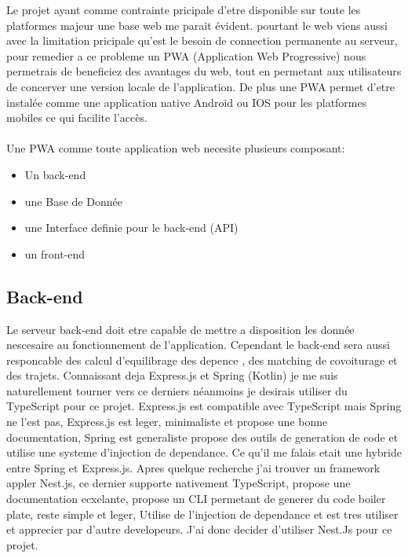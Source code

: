 
Le projet ayant comme contrainte pricipale d'etre disponible sur toute les platformes majeur une base web me parait évident.
pourtant le web viens aussi avec la limitation pricipale qu'est le besoin de connection permanente au serveur,
pour remedier a ce probleme un PWA (Application Web Progressive) nous permetrais de beneficiez des avantages du web,
tout en permetant aux utilisateurs de concerver une version locale de l'application.
De plus une PWA permet d'etre instalée comme une application native Android ou IOS pour les platformes mobiles ce qui facilite l'accès.\\\\

Une PWA comme toute application web necesite plusieurs composant:
\begin{itemize}
    \item Un back-end
    \item une Base de Donnée
    \item une Interface definie pour le back-end (API)
    \item un front-end
\end{itemize}
\subsection{Back-end}\label{subsec:back-end}
Le serveur back-end doit etre capable de mettre a disposition les donnée nescesaire au fonctionnement de l'application.
Cependant le back-end sera aussi responcable des calcul d'equilibrage des depence , des matching de covoiturage et des trajets.
Connaissant deja Express.js et Spring (Kotlin) je me suis naturellement tourner vers ce derniers néanmoins je desirais utiliser du TypeScript pour ce projet.
Express.js est compatible avec TypeScript mais Spring ne l'est pas, Express.js est leger, minimaliste et propose une bonne documentation,
Spring est generaliste propose des outils de generation de code et utilise une systeme d'injection de dependance.
Ce qu'il me falais etait une hybride entre Spring et Express.js.
Apres quelque recherche j'ai trouver un framework appler Nest.js, ce dernier supporte nativement TypeScript, propose une documentation ecxelante,
propose un CLI permetant de generer du code boiler plate, reste simple et leger, Utilise de l'injection de dependance et est tres utiliser et apprecier par d'autre developeurs.
J'ai donc decider d'utiliser Nest.Js pour ce projet.

